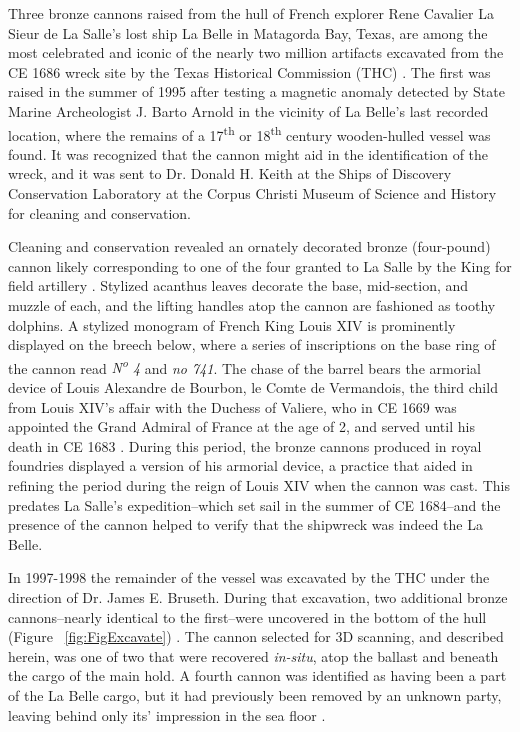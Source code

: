 \documentclass[review]{elsarticle}
\begin{document}
Three bronze cannons raised from the hull of French explorer Rene Cavalier La Sieur de La Salle's lost ship La Belle in Matagorda Bay, Texas, are among the most celebrated and iconic of the nearly two million artifacts excavated from the CE 1686 wreck site by the Texas Historical Commission (THC) \citep{RN5767}. The first was raised in the summer of 1995 after testing a magnetic anomaly detected by State Marine Archeologist J. Barto Arnold in the vicinity of La Belle's last recorded location, where the remains of a 17\textsuperscript{th} or 18\textsuperscript{th} century wooden-hulled vessel \citep{RN5766,RN5765} was found. It was recognized that the cannon might aid in the identification of the wreck, and it was sent to Dr. Donald H. Keith at the Ships of Discovery Conservation Laboratory at the Corpus Christi Museum of Science and History for cleaning and conservation.

Cleaning and conservation revealed an ornately decorated bronze (four-pound) cannon likely corresponding to one of the four granted to La Salle by the King for field artillery \citep{RN5763,RN5764}. Stylized acanthus leaves decorate the base, mid-section, and muzzle of each, and the lifting handles atop the cannon are fashioned as toothy dolphins. A stylized monogram of French King Louis XIV is prominently displayed on the breech below, where a series of inscriptions on the base ring of the cannon read \textit{N\textsuperscript{o} 4} and \textit{no  741}. The chase of the barrel bears the armorial device of Louis Alexandre de Bourbon, le Comte de Vermandois, the third child from Louis XIV's affair with the Duchess of Valiere, who in CE 1669 was appointed the Grand Admiral of France at the age of 2, and served until his death in CE 1683 \citep[354]{RN5763}. During this period, the bronze cannons produced in royal foundries displayed a version of his armorial device, a practice that aided in refining the period during the reign of Louis XIV when the cannon was cast. This predates La Salle's expedition--which set sail in the summer of CE 1684--and the presence of the cannon helped to verify that the shipwreck was indeed the La Belle.

In 1997-1998 the remainder of the vessel was excavated by the THC under the direction of Dr. James E. Bruseth. During that excavation, two additional bronze cannons--nearly identical to the first--were uncovered in the bottom of the hull (Figure ~\ref{fig:FigExcavate}) \citep{RN5763,RN5762,RN5761}. The cannon selected for 3D scanning, and described herein, was one of two that were recovered \textit{in-situ}, atop the ballast and beneath the cargo of the main hold. A fourth cannon was identified as having been a part of the La Belle cargo, but it had previously been removed by an unknown party, leaving behind only its' impression in the sea floor \citep{RN5763}. 
\end{document}
